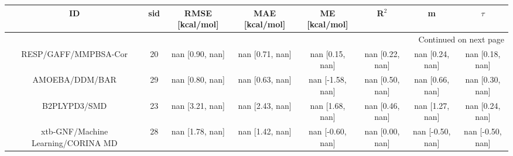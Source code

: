 \documentclass[8pt]{article}
\begin{document}
\begin{center}
\begin{footnotesize}
\begin{longtable}{|cccccccc|}
\toprule
                                 ID & sid &  RMSE [kcal/mol] &   MAE [kcal/mol] &     ME [kcal/mol] &            R$^2$ &                 m &            $\tau$ \\
\midrule
\endhead
\midrule
\multicolumn{8}{r}{{Continued on next page}} \\
\midrule
\endfoot

\bottomrule
\endlastfoot
               RESP/GAFF/MMPBSA-Cor &  20 &  nan [0.90, nan] &  nan [0.71, nan] &   nan [0.15, nan] &  nan [0.22, nan] &   nan [0.24, nan] &   nan [0.18, nan] \\
                     AMOEBA/DDM/BAR &  29 &  nan [0.80, nan] &  nan [0.63, nan] &  nan [-1.58, nan] &  nan [0.50, nan] &   nan [0.66, nan] &   nan [0.30, nan] \\
                       B2PLYPD3/SMD &  23 &  nan [3.21, nan] &  nan [2.43, nan] &   nan [1.68, nan] &  nan [0.46, nan] &   nan [1.27, nan] &   nan [0.24, nan] \\
 xtb-GNF/Machine Learning/CORINA MD &  28 &  nan [1.78, nan] &  nan [1.42, nan] &  nan [-0.60, nan] &  nan [0.00, nan] &  nan [-0.50, nan] &  nan [-0.50, nan] \\
\end{longtable}
\end{footnotesize}
\end{center}
\end{document}
